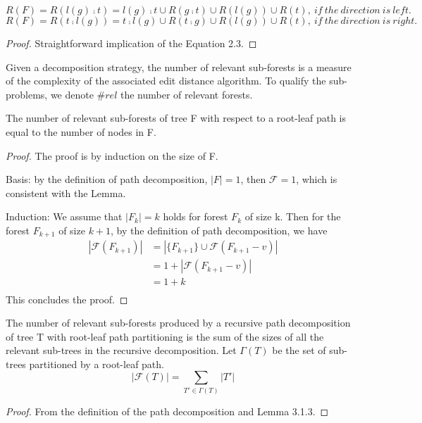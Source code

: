 \begin{lemma}
\begin{equation*}
R(F) = R(l(g) \comp t) = {l(g) \comp t} \cup R(g \comp t) \cup R(l(g)) \cup R(t),\ if\ the\ direction\ is\ left.
\end{equation*}
\begin{equation*}
R(F) = R(t \comp l(g)) = {t \comp l(g)} \cup R(t \comp g) \cup R(l(g)) \cup R(t),\ if\ the\ direction\ is\ right.
\end{equation*}
\end{lemma}
\begin{proof}
Straightforward implication of the Equation 2.3.
\end{proof}

Given a decomposition strategy, the number of relevant sub-forests is a measure of the complexity of the associated edit distance algorithm. To qualify the sub-problems, we denote $\#rel$ the number of relevant forests.

\begin{lemma}
The number of relevant sub-forests of tree F with respect to a root-leaf path is equal to the
number of nodes in F.
\end{lemma}
\begin{proof}
The proof is by induction on the size of F.

Basis: by the definition of path decomposition, $\left\vert F \right\vert = 1$, then $\mathcal{F} = 1$, which is consistent with the Lemma.

Induction: We assume that $\left\vert F_k \right\vert = k$ holds for forest $F_k$ of size k. Then for the forest $F_{k+1}$ of size $k + 1$, by the definition of path decomposition, we have 
\begin{align*}
\left\vert \mathcal{F}(F_{k+1}) \right\vert &= \left\vert \{F_{k+1}\} \cup \mathcal{F}(F_{k+1}-v) \right\vert \\ 
&= 1 + \left\vert \mathcal{F}(F_{k+1} - v) \right\vert \\
&= 1 + k\\
\end{align*}
This concludes the proof.
\end{proof}

\begin{lemma}
The number of relevant sub-forests produced by a recursive path decomposition of tree T with root-leaf path partitioning is the sum of the sizes of all the relevant sub-trees in the recursive decomposition. Let $\Gamma(T)$ be the set of sub-trees partitioned by a root-leaf path.
\begin{equation*}
\left\vert \mathcal{F}(T) \right\vert = \sum_{T' \in \Gamma(T)}\left\vert T' \right\vert
\end{equation*}
\end{lemma}
\begin{proof}
From the definition of the path decomposition and Lemma 3.1.3.
\end{proof}


